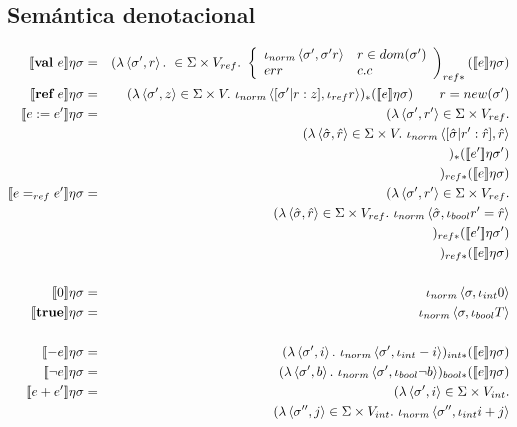   \subsection{Semántica denotacional}
    \begin{eqnarray*}
      \se{\textbf{val}\ e}\eta\s &=& (\lambda \la\s',r\ra.\ \in \Sigma \times V_{ref}.
        \ \left\lbrace 
        \begin{array}{lll}
          \iota_{norm} \la\s',\s' r\ra & r\in dom(\s') \\
          err & c.c
        \end{array}\right)_{ref*} (\se{e}\eta\s) \\
      \se{\textbf{ref} \ e}\eta\s &=& (\lambda \la\s',z\ra \in \Sigma \times V. \ \iota_{norm}\la[\s'|r:z],\iota_{ref}r\ra)_* (\se{e}\eta\s) \qquad r = new(\sigma')\\
      \se{e:=e'}\eta\s &=& (\lambda \la\s',r'\ra \in \Sigma \times V_{ref}. \\
        && \qquad (\lambda \la\hat{\s},\hat{r}\ra \in \Sigma \times V.\ \iota_{norm} \la[\hat{\s}|r':\hat{r}],\hat{r}\ra \\
        && \qquad )_* (\se{e'}\eta\s') \\
        && )_{ref*} (\se{e}\eta\s) \\
      \se{e=_{ref}e'}\eta\s &=& (\lambda \la\s',r'\ra \in \Sigma \times V_{ref}. \\
        && \qquad (\lambda \la\hat{\s},\hat{r}\ra \in \Sigma \times V_{ref}.\ \iota_{norm} \la\hat{\s},\iota_{bool}r'=\hat{r}\ra \\
        && \qquad )_{ref*} (\se{e'}\eta\s') \\
        && )_{ref*}(\se{e}\eta\s) \\ \\
      \se{0}\eta\s &=& \iota_{norm}\la \s,\iota_{int}0\ra \\
      \se{\textbf{true}}\eta\s &=& \iota_{norm}\la \s,\iota_{bool}T\ra \\ \\
      \se{-e}\eta\s &=& (\lambda \la \s',i\ra.\ \iota_{norm}\la \s',\iota_{int}-i\ra)_{int*}(\se{e}\eta\s) \\
      \se{\neg e}\eta\s &=& (\lambda \la \s',b\ra.\ \iota_{norm}\la \s',\iota_{bool}\neg b\ra)_{bool*}(\se{e}\eta\s) \\
      \se{e+e'}\eta\s &=& (\lambda \la \s',i\ra \in \Sigma \times V_{int}. \\
        && \qquad (\lambda \la \s'',j\ra \in \Sigma \times V_{int}.\  \iota_{norm}\la \s'',\iota_{int}i+j\ra \\

\end{eqnarray*}

